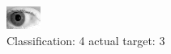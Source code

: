 \begin{figure}[h!]
\begin{center}
\includegraphics[width=0.60\columnwidth]{figures/ID274_class_4_target_3.png}
\end{center}
\caption{ Classification: 4 actual target: 3}
\label{fig:ID274_class_4_target_3}
\end{figure}
